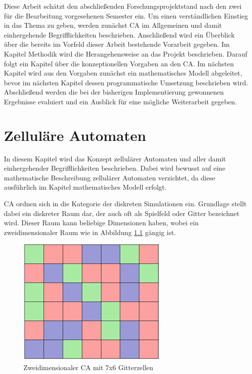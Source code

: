 \documentclass[11pt,a4paper,pointlessnumbers]{scrreprt}  %
\begin{document}
Diese Arbeit schätzt den abschließenden Forschungsprojektstand nach den zwei für die Bearbeitung vorgesehenen Semester ein. Um einen verständlichen Einstieg in das Thema zu geben, werden zunächst CA im Allgemeinen und damit einhergehende Begrifflichkeiten beschrieben. Anschließend wird ein Überblick über die bereits im Vorfeld dieser Arbeit bestehende Vorarbeit gegeben. Im Kapitel Methodik wird die Herangehensweise an das Projekt beschrieben. Darauf folgt ein Kapitel über die konzeptionellen Vorgaben an den CA. Im nächsten Kapitel wird aus den Vorgaben zunächst ein mathematisches Modell abgeleitet, bevor im nächsten Kapitel dessen programmatische Umsetzung beschrieben wird. Abschließend werden die bei der bisherigen Implementierung gewonnenen Ergebnisse evaluiert und ein Ausblick für eine mögliche Weiterarbeit gegeben.
 
\chapter{Zelluläre Automaten}
In diesem Kapitel wird das Konzept zellulärer Automaten und aller damit einhergehender Begrifflichkeiten beschrieben.
Dabei wird bewusst auf eine mathematische Beschreibung zellulärer Automaten verzichtet, da diese ausführlich im Kapitel mathematisches Modell erfolgt. \par
CA ordnen sich in die Kategorie der diskreten Simulationen ein. Grundlage stellt dabei ein diskreter Raum dar, der auch oft als Spielfeld oder Gitter bezeichnet wird. Dieser Raum kann beliebige Dimensionen haben, wobei ein zweidimensionaler Raum wie in Abbildung \ref{fig:Zustand} gängig ist. 

\begin{figure}[!ht]
	\centering
	\includegraphics{Zustandsfaerbung}
	\caption{Zweidimensionaler CA mit 7x6 Gitterzellen \cite{Scholz2014}}
	\label{fig:Zustand}
\end{figure}
\end{document}

